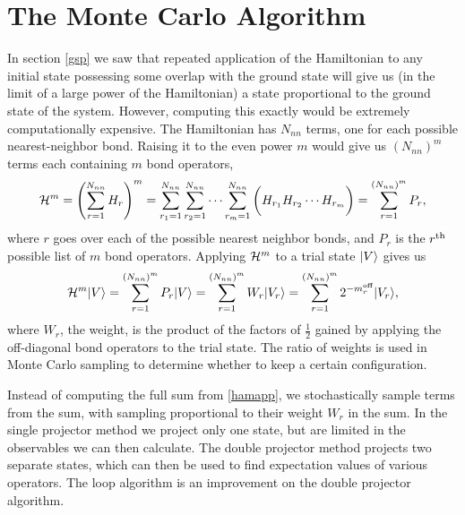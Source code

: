 \section{The Monte Carlo Algorithm}
In section \ref{gsp} we saw that repeated application of the Hamiltonian to any initial state possessing some overlap with the ground state will
give us (in the limit of a large power of the Hamiltonian) a state proportional to the
ground state of the system.
However, computing this exactly would be extremely computationally expensive.
The Hamiltonian has $N_{nn}$ terms, one for each possible nearest-neighbor bond.  
Raising it to the even power $m$ would give us $(N_{nn})^m$ terms each containing $m$ bond operators,
\begin{equation} \label{bopss}  
	\mathcal{H}^m=\left(\sum_{r=1}^{N_{nn}}H_r\right)^m=
	\sum_{r_1=1}^{N_{nn}}\sum_{r_2=1}^{N_{nn}}\cdots \sum_{r_m=1}^{N_{nn}}
	\bigg( H_{r_1} H_{r_2} \cdots H_{r_m} \bigg) 
	=\sum_{r=1}^{(N_{nn})^m} P_r,
\end{equation}
where $r$ goes over each of the possible nearest neighbor bonds, and $P_r$ is the $r^{\rm th}$ possible list of $m$ bond operators.  
Applying $\mathcal{H}^m$ to a trial state $\lvert {V} \rangle$ gives us
\begin{equation} \label{hamapp}
	\mathcal{H}^m \lvert {V} \rangle = \sum_{r=1}^{(N_{nn})^m} P_r \lvert {V} \rangle = \sum_{r=1}^{(N_{nn})^m} W_r\lvert {V_r} \rangle
	= \sum_{r=1}^{(N_{nn})^m} 2^{-m_r^{\text{off}}}\lvert {V_r} \rangle,
\end{equation}
where $W_r$, the weight, is the product of the factors of $\frac{1}{2}$ gained by applying the off-diagonal bond operators to the trial state.
The ratio of weights is used in Monte Carlo sampling to determine whether to keep a certain configuration.

Instead of computing the full sum from \eqref{hamapp}, we stochastically sample terms
from the sum, with sampling proportional to their weight $W_r$ in the sum.  
In the single projector method we project only one state, but are limited in the observables we can then calculate.
The double projector method projects two separate states, which can then be used to find expectation values of various operators.
The loop algorithm is an improvement on the double projector algorithm. 

